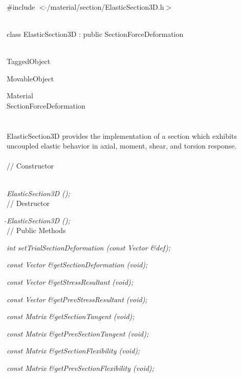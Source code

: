 
   \\
\#include $<\tilde{ }$/material/section/ElasticSection3D.h$>$  


  \\
class ElasticSection3D : public SectionForceDeformation 


 \\
TaggedObject 

MovableObject 

\indent\indent Material \\
\indent\indent\indent SectionForceDeformation \\
\indent\indent\indent{} \\

  \\
\indent ElasticSection3D provides the implementation of a
section which exhibits uncoupled elastic behavior in axial, moment,
shear, and torsion response. \\

 \\
// Constructor 

 \\ 
{\em ElasticSection3D ();} \\ 

// Destructor 

{\em $\tilde{ }$ElasticSection3D ();} \\ 

// Public Methods 

{\em int setTrialSectionDeformation (const Vector \&def); } 

{\em const Vector \&getSectionDeformation (void); } 

{\em const Vector \&getStressResultant (void); } 

{\em const Vector \&getPrevStressResultant (void); } 

{\em const Matrix \&getSectionTangent (void); } 

{\em const Matrix \&getPrevSectionTangent (void); } 

{\em const Matrix \&getSectionFlexibility (void); } 

{\em const Matrix \&getPrevSectionFlexibility (void); } 

